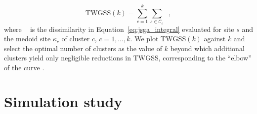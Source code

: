 \documentclass[12pt,compact]{article}
\newcommand{\eJSGa}[1]{\mathop{\mathrm{eJS}_{i, #1}^{\mathrm{G}_{\lambda}}}\nolimits}
\begin{document}
\begin{equation}\label{eq:twgss}
  \mathrm{TWGSS}(k) = \sum_{c=1}^{k} \sum_{s \in \mathcal{C}_c} \eJSGa{s, \kappa_c},
\end{equation}
where $\eJSGa{s, \kappa_c}$ is the dissimilarity in Equation~\eqref{eq:jsga_integral} evaluated for site $s$ and the medoid site $\kappa_c$ of cluster $c$, $c = 1, \ldots, k$.
We plot $\mathrm{TWGSS}(k)$ against $k$ and select the optimal number of clusters as the value of $k$ beyond which additional clusters yield only negligible reductions in $\mathrm{TWGSS}$, corresponding to the ``elbow'' of the curve \citep{Hastie2009}.

\section{Simulation study}
\label{sec:sim}
\end{document}
